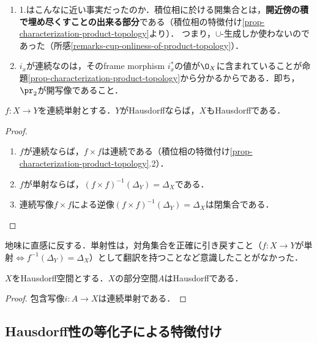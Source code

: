 \documentclass[uplatex,dvipdfmx]{jsreport}
\begin{document}
\begin{remarks}\mbox{}
    \begin{enumerate}
        \item 1.はこんなに近い事実だったのか．積位相に於ける開集合とは，\textbf{開近傍の積で埋め尽くすことの出来る部分}である（積位相の特徴付け\ref{prop-characterization-product-topology}より）．
        つまり，$\cup$-生成しか使わないのであった（所感\ref{remarks-cup-onliness-of-product-topology}）．
        \item $i_x$が連続なのは，そのframe morphism $i_x^*$の値が$\O_X$に含まれていることが命題\ref{prop-characterization-product-topology}から分かるからである．即ち，$\pr_2$が開写像であること．
    \end{enumerate}
\end{remarks}

\begin{proposition}\label{prop-Hausdorff性は連続単射によって足に感染る}
    $f:X\to Y$を連続単射とする．$Y$がHausdorffならば，$X$もHausdorffである．
\end{proposition}
\begin{proof}\mbox{}
    \begin{enumerate}
        \item $f$が連続ならば，$f\times f$は連続である（積位相の特徴付け\ref{prop-characterization-product-topology}.2）．
        \item $f$が単射ならば，$(f\times f)^{-1}(\Delta_Y)=\Delta_X$である．
        \item 連続写像$f\times f$による逆像$(f\times f)^{-1}(\Delta_Y)=\Delta_X$は閉集合である．
    \end{enumerate}
\end{proof}
\begin{remarks}
    地味に直感に反する．単射性は，対角集合を正確に引き戻すこと（$f:X\to Y$が単射$\Leftrightarrow f^{-1}(\Delta_Y)=\Delta_X$）として翻訳を持つことなど意識したことがなかった．
\end{remarks}

\begin{corollary}\label{cor-subspace-of-Hausdorff-is-Hausdorff}
    $X$をHausdorff空間とする．$X$の部分空間$A$はHausdorffである．
\end{corollary}
\begin{proof}
    包含写像$i:A\to X$は連続単射である．
\end{proof}

\subsection{Hausdorff性の等化子による特徴付け}
\end{document}
